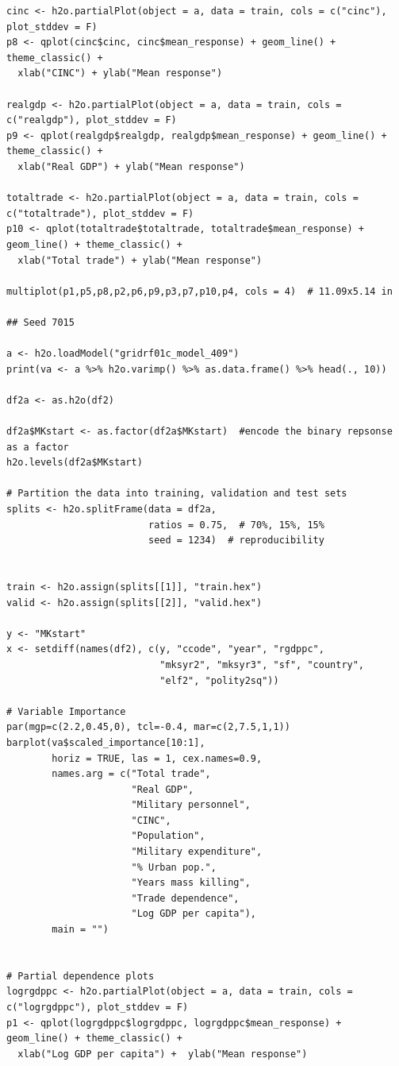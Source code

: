 \begin{verbatim}
cinc <- h2o.partialPlot(object = a, data = train, cols = c("cinc"), plot_stddev = F)
p8 <- qplot(cinc$cinc, cinc$mean_response) + geom_line() + theme_classic() +
  xlab("CINC") + ylab("Mean response")

realgdp <- h2o.partialPlot(object = a, data = train, cols = c("realgdp"), plot_stddev = F)
p9 <- qplot(realgdp$realgdp, realgdp$mean_response) + geom_line() + theme_classic() +
  xlab("Real GDP") + ylab("Mean response")

totaltrade <- h2o.partialPlot(object = a, data = train, cols = c("totaltrade"), plot_stddev = F)
p10 <- qplot(totaltrade$totaltrade, totaltrade$mean_response) + geom_line() + theme_classic() +
  xlab("Total trade") + ylab("Mean response")

multiplot(p1,p5,p8,p2,p6,p9,p3,p7,p10,p4, cols = 4)  # 11.09x5.14 in

## Seed 7015

a <- h2o.loadModel("gridrf01c_model_409")
print(va <- a %>% h2o.varimp() %>% as.data.frame() %>% head(., 10))

df2a <- as.h2o(df2)

df2a$MKstart <- as.factor(df2a$MKstart)  #encode the binary repsonse as a factor
h2o.levels(df2a$MKstart)

# Partition the data into training, validation and test sets
splits <- h2o.splitFrame(data = df2a, 
                         ratios = 0.75,  # 70%, 15%, 15%
                         seed = 1234)  # reproducibility


train <- h2o.assign(splits[[1]], "train.hex")   
valid <- h2o.assign(splits[[2]], "valid.hex") 

y <- "MKstart"
x <- setdiff(names(df2), c(y, "ccode", "year", "rgdppc",
                           "mksyr2", "mksyr3", "sf", "country",
                           "elf2", "polity2sq"))  

# Variable Importance
par(mgp=c(2.2,0.45,0), tcl=-0.4, mar=c(2,7.5,1,1))
barplot(va$scaled_importance[10:1],
        horiz = TRUE, las = 1, cex.names=0.9,
        names.arg = c("Total trade",
                      "Real GDP",
                      "Military personnel",
                      "CINC",
                      "Population", 
                      "Military expenditure",
                      "% Urban pop.",
                      "Years mass killing",
                      "Trade dependence", 
                      "Log GDP per capita"),
        main = "")


# Partial dependence plots
logrgdppc <- h2o.partialPlot(object = a, data = train, cols = c("logrgdppc"), plot_stddev = F)
p1 <- qplot(logrgdppc$logrgdppc, logrgdppc$mean_response) + geom_line() + theme_classic() +
  xlab("Log GDP per capita") +  ylab("Mean response")


\end{verbatim}
